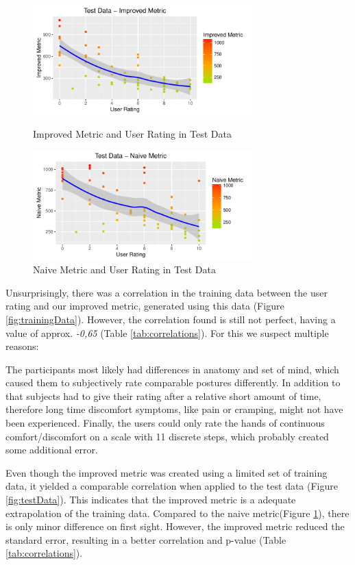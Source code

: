 \documentclass{sig-alternate-05-2015}
\begin{document}
\begin{figure}[t]
\centering
\includegraphics[width=8.45cm]{TestDataImproved}
\vspace{-20pt}
\caption{Improved Metric and User Rating in Test Data}
\label{fig:testData}

\includegraphics[width=8.45cm]{TestDataNaive}
\vspace{-20pt}
\caption{Naive Metric and User Rating in Test Data}
\label{fig:testDataNaive}
\vspace{-10pt}
\end{figure}


Unsurprisingly, there was a correlation in the training data between the user rating and our improved metric, generated using this data (Figure \ref{fig:trainingData}). However, the correlation found is still not perfect, having a value of approx. \textsl{-0,65} (Table \ref{tab:correlations}). For this we suspect multiple reasons: 

The participants most likely had differences in anatomy and set of mind, which caused them to subjectively rate comparable postures differently. In addition to that subjects had to give their rating after a relative short amount of time, therefore long time discomfort symptoms, like pain or cramping, might not have been experienced. Finally, the users could only rate the hands of continuous comfort/discomfort on a scale with 11 discrete steps, which probably created some additional error.

Even though the improved metric was created using a limited set of training data, it yielded a comparable correlation when applied to the test data (Figure \ref{fig:testData}). This indicates that the improved metric is a adequate extrapolation of the training data. Compared to the naive metric(Figure \ref{fig:testDataNaive}), there is only minor difference on first sight. However, the improved metric reduced the standard error, resulting in a better correlation and p-value (Table \ref{tab:correlations}).
\end{document}
